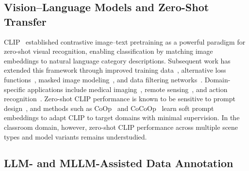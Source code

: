 \documentclass{ieeeaccess}
\begin{document}
\subsection{Vision--Language Models and Zero-Shot Transfer}

CLIP~\cite{radford2021learning} established contrastive
image--text pretraining as a powerful paradigm for zero-shot visual
recognition, enabling classification by matching image embeddings to
natural language category descriptions.
Subsequent work has extended this framework through improved training
data~\cite{schuhmann2022laion5b,cherti2023reproducible}, alternative
loss functions~\cite{zhai2023sigmoid}, masked image
modeling~\cite{sun2023eva02}, and data filtering
networks~\cite{fang2023data}.
Domain-specific applications include medical
imaging~\cite{wang2022medclip}, remote sensing~\cite{liu2024remoteclip},
and action recognition~\cite{wang2021actionclip}.
Zero-shot CLIP performance is known to be sensitive to prompt
design~\cite{radford2021learning}, and methods such as
CoOp~\cite{zhou2022learning} and CoCoOp~\cite{zhou2022conditional}
learn soft prompt embeddings to adapt CLIP to target domains with
minimal supervision.
In the classroom domain, however, zero-shot CLIP performance across
multiple scene types and model variants remains understudied.

\subsection{LLM- and MLLM-Assisted Data Annotation}
\end{document}
